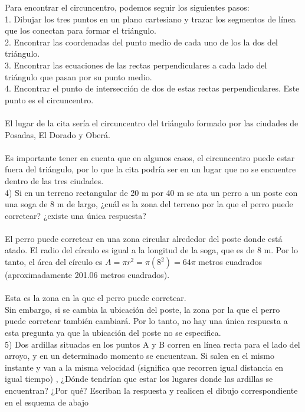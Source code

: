 \documentclass{article}
\begin{document}
Para encontrar el circuncentro, podemos seguir los siguientes pasos:\\
1. Dibujar los tres puntos en un plano cartesiano y trazar los segmentos de línea que los conectan para formar el triángulo.\\
2. Encontrar las coordenadas del punto medio de cada uno de los la dos del triángulo.\\
3. Encontrar las ecuaciones de las rectas perpendiculares a cada lado del triángulo que pasan por su punto medio.\\
4. Encontrar el punto de intersección de dos de estas rectas perpendiculares. Este punto es el circuncentro.\\
\\
El lugar de la cita sería el circuncentro del triángulo formado por las ciudades de Posadas, El Dorado y Oberá.\\
\\
Es importante tener en cuenta que en algunos casos, el circuncentro puede estar fuera del triángulo, por lo que la cita podría ser en un lugar que no se encuentre dentro de las tres ciudades.\\



4) Si en un terreno rectangular de 20 m por 40 m se ata un perro a un poste con una soga de 8 m de largo, ¿cuál es la zona del terreno por la que el perro puede corretear? ¿existe una única respuesta? \\ \\

El perro puede corretear en una zona circular alrededor del poste donde está atado. El radio del círculo es igual a la longitud de la soga, que es de 8 m. Por lo tanto, el área del círculo es $A = \pi r^2 = \pi(8^2) = 64\pi$ metros cuadrados (aproximadamente 201.06 metros cuadrados). \\ \\
Esta es la zona en la que el perro puede corretear.
\\
Sin embargo, si se cambia la ubicación del poste, la zona por la que el perro puede corretear también cambiará. Por lo tanto, no hay una única respuesta a esta pregunta ya que la ubicación del poste no se especifica.\\

5) Dos ardillas situadas en los puntos A y B corren en línea recta para el lado del arroyo, y en un determinado momento se encuentran. Si salen en el mismo instante y van a la misma velocidad (significa que recorren igual distancia en igual tiempo) , ¿Dónde tendrían que estar los lugares donde las ardillas se encuentran? ¿Por qué? Escriban la respuesta y realicen el dibujo correspondiente en el esquema de abajo \\ \\
\end{document}
